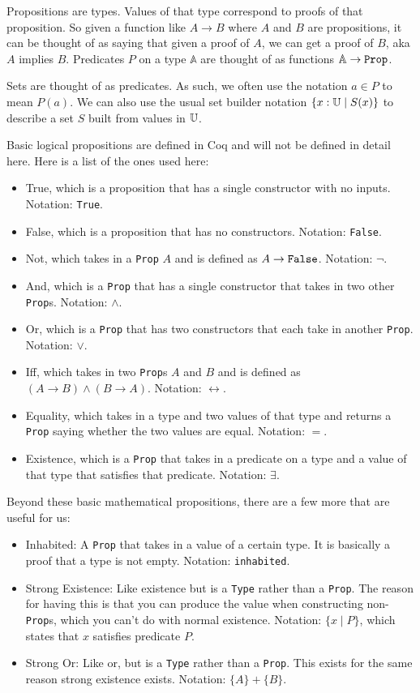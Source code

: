 \documentclass[../math.tex]{subfiles}
\begin{document}
Propositions are types.  Values of that type correspond to proofs of that
proposition.  So given a function like $A \rightarrow B$ where $A$ and $B$ are
propositions, it can be thought of as saying that given a proof of $A$, we can
get a proof of $B$, aka $A$ implies $B$.  Predicates $P$ on a type $\mathbb A$
are thought of as functions $\mathbb A \rightarrow \vtt{Prop}$.

Sets are thought of as predicates.  As such, we often use the notation $a \in P$
to mean $P(a)$.  We can also use the usual set builder notation $\{x : \mathbb{U} \mid
S(x)\}$ to describe a set $S$ built from values in $\mathbb{U}$.

Basic logical propositions are defined in Coq and will not be defined in detail
here.  Here is a list of the ones used here:
\begin{itemize}
    \item True, which is a proposition that has a single constructor with no
    inputs.  Notation: \verb|True|.
    \item False, which is a proposition that has no constructors.  Notation:
    \verb|False|.
    \item Not, which takes in a \verb|Prop| $A$ and is defined as $A \rightarrow
    \verb|False|$.  Notation: $\neg$.
    \item And, which is a \verb|Prop| that has a single constructor that takes
    in two other \verb|Prop|s.  Notation: $\wedge$.
    \item Or, which is a \verb|Prop| that has two constructors that each take
    in another \verb|Prop|.  Notation: $\vee$.
    \item Iff, which takes in two \verb|Prop|s $A$ and $B$ and is defined as $(A
    \rightarrow B) \wedge (B \rightarrow A)$.  Notation: $\leftrightarrow$.
    \item Equality, which takes in a type and two values of that type and
    returns a \verb|Prop| saying whether the two values are equal.  Notation:
    $=$.
    \item Existence, which is a \verb|Prop| that takes in a predicate on a type
    and a value of that type that satisfies that predicate.  Notation:
    $\exists$.
\end{itemize}

Beyond these basic mathematical propositions, there are a few more that are
useful for us:

\begin{itemize}
    \item Inhabited: A \verb|Prop| that takes in a value of a certain type.  It
    is basically a proof that a type is not empty.  Notation: \verb|inhabited|.
    \item Strong Existence: Like existence but is a \verb|Type| rather than a
    \verb|Prop|.  The reason for having this is that you can produce the value
    when constructing non-\verb|Prop|s, which you can't do with normal
    existence.  Notation: $\{x \mid P\}$, which states that $x$ satisfies
    predicate $P$.
    \item Strong Or: Like or, but is a \verb|Type| rather than a \verb|Prop|.
    This exists for the same reason strong existence exists.  Notation: $\{A\} +
    \{B\}$.
\end{itemize}
\end{document}
